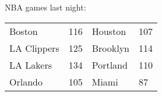 NBA games last night:
\begin{tabular}{llll}
\toprule
     Boston & 116 &  Houston & 107 \\
LA Clippers & 125 & Brooklyn & 114 \\
  LA Lakers & 134 & Portland & 110 \\
    Orlando & 105 &    Miami &  87 \\
\bottomrule
\end{tabular}

